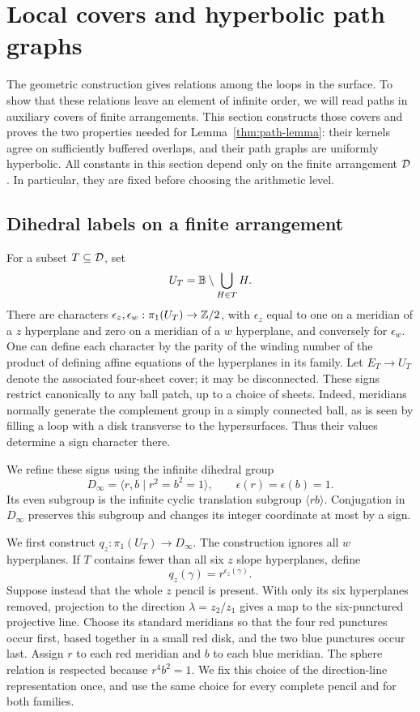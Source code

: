 \section{Local covers and hyperbolic path graphs}\label{sec:models}

The geometric construction gives relations among the loops in the
surface.  To show that these relations leave an element of infinite
order, we will read paths in auxiliary covers of finite arrangements.
This section constructs those covers and proves the two properties
needed for Lemma~\ref{thm:path-lemma}: their kernels agree on sufficiently
buffered overlaps, and their path graphs are uniformly hyperbolic.
All constants in this section depend only on the finite arrangement
$\mathcal D$.  In particular, they are fixed before choosing the arithmetic
level.

\subsection{Dihedral labels on a finite arrangement}

For a subset $T\subseteq\mathcal D$, set
\[
 U_T=\mathbb B\setminus\bigcup_{H\in T}H.
\]
There are characters $\epsilon_z,\epsilon_w:\pi_1(U_T)\to\mathbb Z/2$,
with $\epsilon_z$ equal to one on a meridian of a $z$ hyperplane and
zero on a meridian of a $w$ hyperplane, and conversely for
$\epsilon_w$.  One can define each character by the parity of the
winding number of the product of defining affine equations of the
hyperplanes in its family.  Let $E_T\to U_T$ denote the associated
four-sheet cover; it may be disconnected.  These signs restrict
canonically to any ball patch, up to a choice of sheets.  Indeed,
meridians normally generate the complement group in a simply connected
ball, as is seen by filling a loop with a disk transverse to the
hypersurfaces.  Thus their values determine a sign character there.

We refine these signs using the infinite dihedral group
\[
 D_\infty=\langle r,b\mid r^2=b^2=1\rangle,
 \qquad \epsilon(r)=\epsilon(b)=1.
\]
Its even subgroup is the infinite cyclic translation subgroup
$\langle rb\rangle$.  Conjugation in $D_\infty$ preserves this subgroup
and changes its integer coordinate at most by a sign.

We first construct $q_z:\pi_1(U_T)\to D_\infty$.  The construction
ignores all $w$ hyperplanes.  If $T$ contains fewer than all six $z$
slope hyperplanes, define
\[
 q_z(\gamma)=r^{\epsilon_z(\gamma)}.
\]
Suppose instead that the whole $z$ pencil is present.  With only its
six hyperplanes removed, projection to the direction
$\lambda=z_2/z_1$ gives a map to the six-punctured projective line.
Choose its standard meridians so that the four red punctures occur
first, based together in a small red disk, and the two blue punctures
occur last.  Assign $r$ to each red meridian and $b$ to each blue
meridian.  The sphere relation is respected because $r^4b^2=1$.
We fix this choice of the direction-line representation once, and use
the same choice for every complete pencil and for both families.

